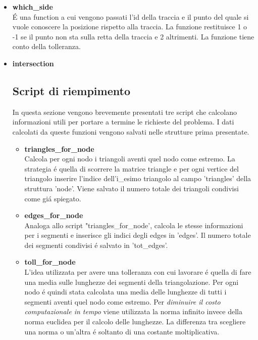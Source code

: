 \documentclass[11pt, a4paper]{article}
\begin{document}
\begin{itemize}
    \item \textbf{which\_side} \\
    \'E una function a cui vengono passati l'id della traccia e il punto del quale si vuole conoscere la posizione rispetto alla traccia. La funzione restituisce 1 o -1 se il punto non sta sulla retta della traccia e 2 altrimenti. La funzione tiene conto della tolleranza.
    \item \textbf{intersection} \\
    \subsection{\textbf{Script di riempimento}}
    In questa sezione vengono brevemente presentati tre script che calcolano informazioni utili per portare a termine le richieste del problema. I dati calcolati da queste funzioni vengono salvati nelle strutture prima presentate.


    \begin{itemize}
         \item \textbf{triangles\_for\_node}\\
        Calcola per ogni nodo i triangoli aventi quel nodo come estremo. La strategia \'e quella di scorrere la matrice triangle e per ogni vertice del triangolo inserire l'indice dell'i\_esimo triangolo al campo 'triangles' della struttura 'node'. Viene salvato il numero totale dei triangoli condivisi come gi\'a spiegato.
        \item \textbf{edges\_for\_node}\\
        Analoga allo script "triangles\_for\_node', calcola le stesse informazioni per i segmenti e inserisce gli indici degli edges in 'edges'. Il numero totale dei segmenti condivisi \'e salvato in 'tot\_edges'.
        \item \textbf{toll\_for\_node}\\
        L'idea utilizzata per avere una tolleranza con cui lavorare \'e quella di fare una media sulle lunghezze dei segmenti della triangolazione. Per ogni nodo \'e quindi stata calcolata una media delle lunghezze di tutti i segmenti aventi quel nodo come estremo. Per \textit{diminuire il costo computazionale in tempo} viene utilizzata la norma infinito invece della norma euclidea per il calcolo delle lunghezze. La differenza tra scegliere una norma o un'altra \'e soltanto di una costante moltiplicativa.

    \end{itemize}


\end{itemize}
\end{document}
